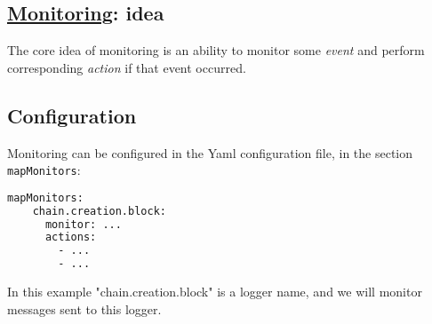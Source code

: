 

\pagecolor{atomictangerine!50}




\begin{mdframed}
\section*{\href{https://github.com/The-Blockchain-Company/tbco-monitoring-framework/blob/master/tbco-monitoring/src/Bcc/BM/Backend/Monitoring.lhs}{Monitoring}: idea}

    The core idea of monitoring is an ability to monitor some \textit{event} and perform corresponding \textit{action} if that event occurred.
\end{mdframed}

\begin{mdframed}
\section*{Configuration}

Monitoring can be configured in the Yaml configuration file, in the section \texttt{mapMonitors}:

\begin{lstlisting}[language=bash]
  mapMonitors:
    chain.creation.block:
      monitor: ...
      actions:
        - ...
        - ...
\end{lstlisting}

In this example "chain.creation.block" is a logger name, and we will monitor messages sent to this logger.

\end{mdframed}

